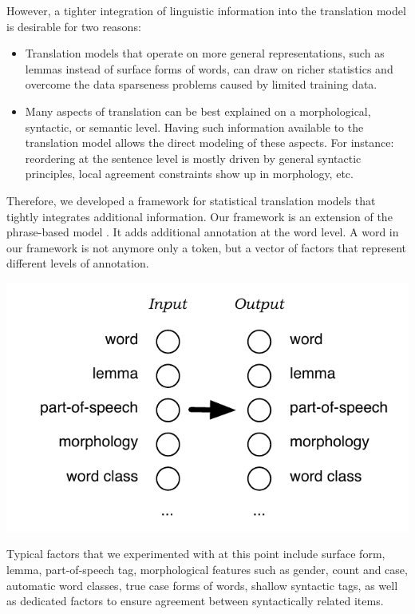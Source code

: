 \documentclass[10pt]{report}
\theoremstyle{plain}
\begin{document}
However, a tighter integration of linguistic information into the translation model is desirable for two reasons:
\begin{itemize}
\item Translation models that operate on more general representations, such as lemmas instead of surface forms of words, can draw on richer statistics and overcome the data sparseness problems caused by limited training data.
\item Many aspects of translation can be best explained on a morphological, syntactic, or semantic level. Having such information available to the translation model allows the direct modeling of these aspects. For instance: reordering at the sentence level is mostly driven by general syntactic principles, local agreement constraints show up in morphology, etc.
\end{itemize}

Therefore, we developed a framework for statistical translation models that tightly integrates additional information. Our framework is an extension of the phrase-based model \cite{OchThesis}. It adds additional annotation at the word level. A word in our framework is not anymore only a token, but a vector of factors that represent different levels of annotation.

\begin{center}
\includegraphics[scale=1]{factors.pdf}
\end{center}

Typical factors that we experimented with at this point include surface form, lemma, part-of-speech tag, morphological features such as gender, count and case, automatic word classes, true case forms of words, shallow syntactic tags, as well as dedicated factors to ensure agreement between syntactically related items. 
\end{document}

